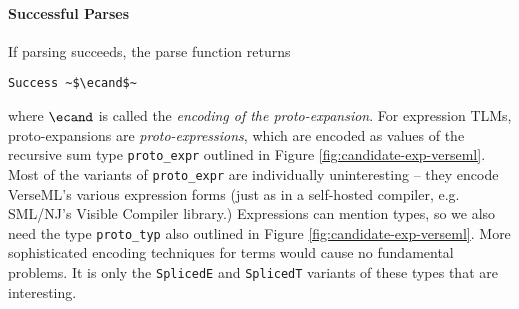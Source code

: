 \documentclass[acmsmall,10pt,review,anonymous]{acmart}\settopmatter{printfolios=true}
\newcommand{\li}[1]{\lstinline{#1}}
\begin{document}


\paragraph{Successful Parses} If parsing succeeds, the parse function returns 
\begin{lstlisting}[numbers=none]
  Success ~$\ecand$~
\end{lstlisting} 
where $\ecand$ is called the \emph{encoding of the proto-expansion}. For expression TLMs, proto-expansions are \emph{proto-expressions}, which are encoded as values of the recursive sum type \lstinline{proto_expr} outlined in Figure \ref{fig:candidate-exp-verseml}.
Most of the variants of \li{proto_expr} are individually uninteresting -- they encode VerseML's various expression forms (just as in a self-hosted compiler, e.g. SML/NJ's Visible Compiler library.) 
Expressions can mention types, so we also need the type \li{proto_typ} also outlined in Figure \ref{fig:candidate-exp-verseml}. More sophisticated encoding techniques for terms would cause no fundamental problems. It is only the \li{SplicedE} and \li{SplicedT} variants of these types that are interesting.





\end{document}
